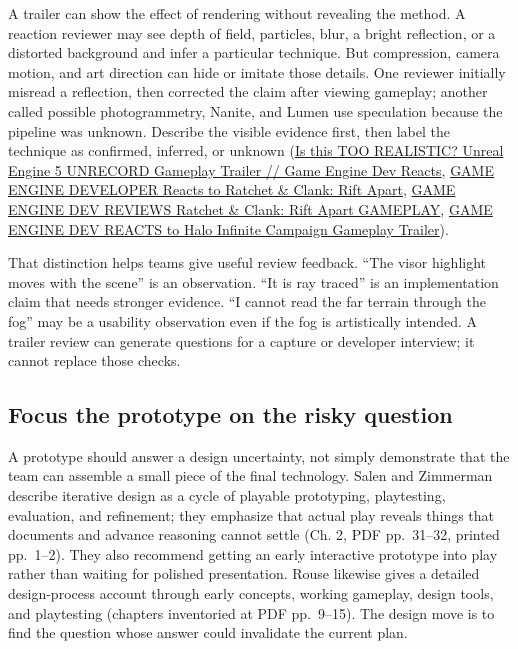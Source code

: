 A trailer can show the effect of rendering without revealing the method. A reaction reviewer may see depth of field, particles, blur, a bright reflection, or a distorted background and infer a particular technique. But compression, camera motion, and art direction can hide or imitate those details. One reviewer initially misread a reflection, then corrected the claim after viewing gameplay; another called possible photogrammetry, Nanite, and Lumen use speculation because the pipeline was unknown. Describe the visible evidence first, then label the technique as confirmed, inferred, or unknown (\href{https://www.youtube.com/watch?v=p4aAMPtNIsQ&t=0m0s}{Is this TOO REALISTIC? Unreal Engine 5 UNRECORD Gameplay Trailer // Game Engine Dev Reacts}, \href{https://www.youtube.com/watch?v=qCSyy5BTDuc&t=0m0s}{GAME ENGINE DEVELOPER Reacts to Ratchet \& Clank: Rift Apart}, \href{https://www.youtube.com/watch?v=d5_9EEfN-Mw&t=0m0s}{GAME ENGINE DEV REVIEWS Ratchet \& Clank: Rift Apart GAMEPLAY}, \href{https://www.youtube.com/watch?v=HWtEcbiuLBQ&t=0m0s}{GAME ENGINE DEV REACTS to Halo Infinite \textbar{} Campaign Gameplay Trailer}).

That distinction helps teams give useful review feedback. ``The visor highlight moves with the scene'' is an observation. ``It is ray traced'' is an implementation claim that needs stronger evidence. ``I cannot read the far terrain through the fog'' may be a usability observation even if the fog is artistically intended. A trailer review can generate questions for a capture or developer interview; it cannot replace those checks.

\subsection{Focus the prototype on the risky question}\label{05-engine-i-ch009-focus-the-prototype-on-the-risky-question}

A prototype should answer a design uncertainty, not simply demonstrate that the team can assemble a small piece of the final technology. Salen and Zimmerman describe iterative design as a cycle of playable prototyping, playtesting, evaluation, and refinement; they emphasize that actual play reveals things that documents and advance reasoning cannot settle (Ch. 2, PDF pp.~31--32, printed pp.~1--2). They also recommend getting an early interactive prototype into play rather than waiting for polished presentation. Rouse likewise gives a detailed design-process account through early concepts, working gameplay, design tools, and playtesting (chapters inventoried at PDF pp.~9--15). The design move is to find the question whose answer could invalidate the current plan.

